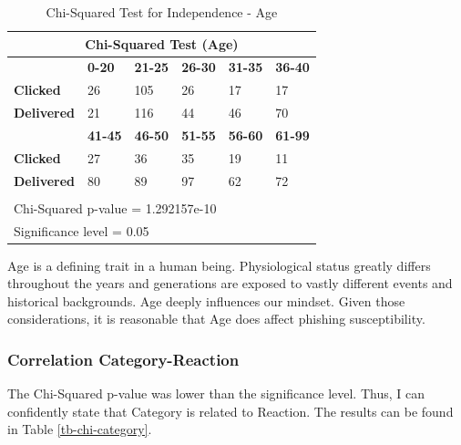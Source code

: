 \documentclass[a4paper]{article}
\begin{document}
\begingroup
\renewcommand{\arraystretch}{1.25}
\begin{table}[ht]
\begin{center}
    \begin{tabular}{ | l | l | l | l | l | l | }
    \hline
    \multicolumn{6}{|c|}{Chi-Squared Test (Age)} \\ \hline
    \textbf{} & \textbf{0-20} & \textbf{21-25} & \textbf{26-30} & \textbf{31-35} & \textbf{36-40} \\
    \hline
    \textbf{Clicked} & 26 & 105 & 26 & 17 & 17 \\ \hline
    \textbf{Delivered} & 21 & 116 & 44 & 46 & 70 \\ \hline
    \textbf{} & \textbf{41-45} & \textbf{46-50} & \textbf{51-55} & \textbf{56-60} & \textbf{61-99} \\ \hline
    \textbf{Clicked} & 27 & 36 & 35 & 19 & 11 \\ \hline
    \textbf{Delivered} & 80 & 89 & 97 & 62 & 72 \\ \hline
    \multicolumn{6}{l}{} \\ \hline
    \multicolumn{6}{|l|}{Chi-Squared p-value = 1.292157e-10} \\
    \multicolumn{6}{|l|}{Significance level = 0.05} \\ \hline
    \end{tabular}
\end{center}
\caption{Chi-Squared Test for Independence - Age}
\label{tb-chi-age}
\end{table}

\noindent
Age is a defining trait in a human being. Physiological status greatly differs throughout the years and generations are exposed to vastly different events and historical backgrounds. Age deeply influences our mindset. Given those considerations, it is reasonable that Age does affect phishing susceptibility.

\newpage

\subsubsection{Correlation Category-Reaction}

The Chi-Squared p-value was lower than the significance level. Thus, I can confidently state that Category is related to Reaction. The results can be found in Table \ref{tb-chi-category}.

\bigskip
\end{document}
